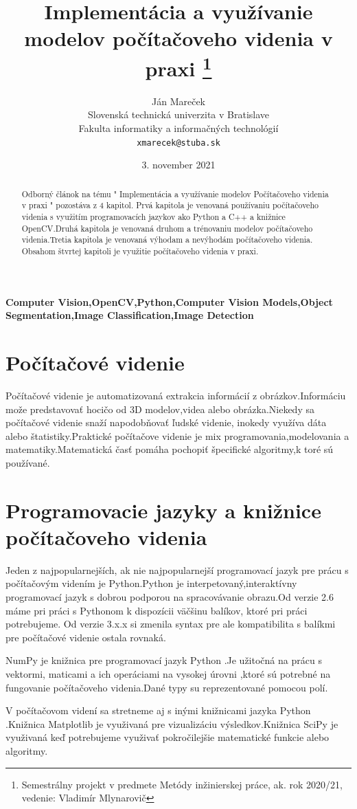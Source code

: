 \documentclass[10pt,twoside,slovak,a4paper]{article}
\title{Implementácia a využívanie modelov počítačoveho videnia v praxi \thanks{Semestrálny projekt v predmete Metódy inžinierskej práce, ak. rok 2020/21, vedenie: Vladimír Mlynarovič}} %
\author{Ján Mareček\\[2pt]
	{\small Slovenská technická univerzita v Bratislave}\\
	{\small Fakulta informatiky a informačných technológií}\\
	{\small \texttt{xmarecek@stuba.sk}}
	}
\date{\small 3. november 2021} %
\begin{document}
\maketitle


\begin{abstract}
Odborný článok na tému " Implementácia a využívanie modelov Počítačoveho videnia v praxi " pozostáva z 4 kapitol. Prvá kapitola je venovaná používaniu počítačoveho videnia s využitím programovacích jazykov ako Python a C++ a knižnice OpenCV.Druhá kapitola je venovaná druhom a trénovaniu modelov počítačoveho videnia.Tretia kapitola je venovaná výhodam a nevýhodám počítačoveho videnia. Obsahom štvrtej kapitoli je využitie počítačoveho videnia v praxi. 
\end{abstract}
\textbf{Computer Vision,OpenCV,Python,Computer Vision Models,Object Segmentation,Image Classification,Image Detection}
\section{Počítačové videnie}
Počítačové videnie je automatizovaná extrakcia informácií z obrázkov.Informáciu može predstavovať hocičo od 3D modelov,videa alebo obrázka.Niekedy sa počítačové videnie snaží napodobňovať ľudské videnie, inokedy využíva dáta alebo štatistiky.Praktické počítačove videnie je mix programovania,modelovania a matematiky.Matematická časť pomáha pochopiť špecifické algoritmy,k toré sú používané.

\section{Programovacie jazyky a knižnice počítačoveho videnia}


Jeden z najpopularnejších, ak nie najpopularnejší programovací jazyk pre prácu s počítačovým videním je Python.Python je interpetovaný,interaktívny programovací jazyk s dobrou podporou na spracovávanie obrazu.Od verzie 2.6 máme pri práci s Pythonom k dispozícii väčšinu balíkov, ktoré pri práci potrebujeme. Od verzie 3.x.x si zmenila syntax pre ale kompatibilita s balíkmi pre počítačové videnie ostala rovnaká.\cite{Python-CV}


NumPy je knižnica pre programovací jazyk Python .Je užitočná na prácu s vektormi,  maticami a ich operáciami na vysokej úrovni ,ktoré sú potrebné na fungovanie počítačoveho videnia.Dané typy su reprezentované pomocou polí.


V počítačovom videní sa stretneme aj s inými knižnicami jazyka Python .Knižnica Matplotlib je využivaná pre vizualizáciu  výsledkov.Knižnica SciPy je využivaná keď potrebujeme využivať pokročilejšie matematické funkcie alebo algoritmy.\cite{Python-CV}
\end{document}

